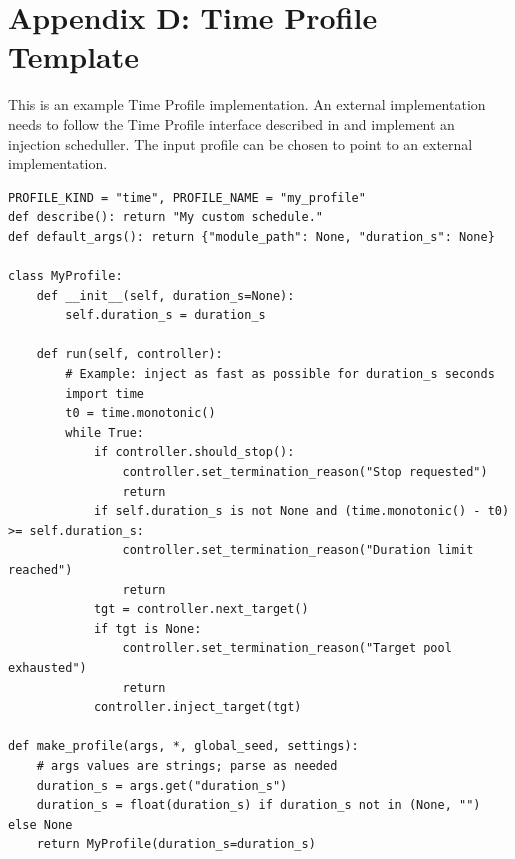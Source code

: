 \chapter{Appendix D: Time Profile Template}
\label{app_d:time_prof}

This is an example Time Profile implementation. An external implementation needs to follow the Time Profile interface described in  and implement an injection scheduller. The input profile can be chosen to point to an external implementation.

\begin{lstlisting}[caption={Minimal template for an external time profile compatible with \texttt{--time input}.},label={lst:fi_time_external_template}]
PROFILE_KIND = "time", PROFILE_NAME = "my_profile"
def describe(): return "My custom schedule."
def default_args(): return {"module_path": None, "duration_s": None}

class MyProfile:
    def __init__(self, duration_s=None):
        self.duration_s = duration_s

    def run(self, controller):
        # Example: inject as fast as possible for duration_s seconds
        import time
        t0 = time.monotonic()
        while True:
            if controller.should_stop():
                controller.set_termination_reason("Stop requested")
                return
            if self.duration_s is not None and (time.monotonic() - t0) >= self.duration_s:
                controller.set_termination_reason("Duration limit reached")
                return
            tgt = controller.next_target()
            if tgt is None:
                controller.set_termination_reason("Target pool exhausted")
                return
            controller.inject_target(tgt)

def make_profile(args, *, global_seed, settings):
    # args values are strings; parse as needed
    duration_s = args.get("duration_s")
    duration_s = float(duration_s) if duration_s not in (None, "") else None
    return MyProfile(duration_s=duration_s)
\end{lstlisting}



